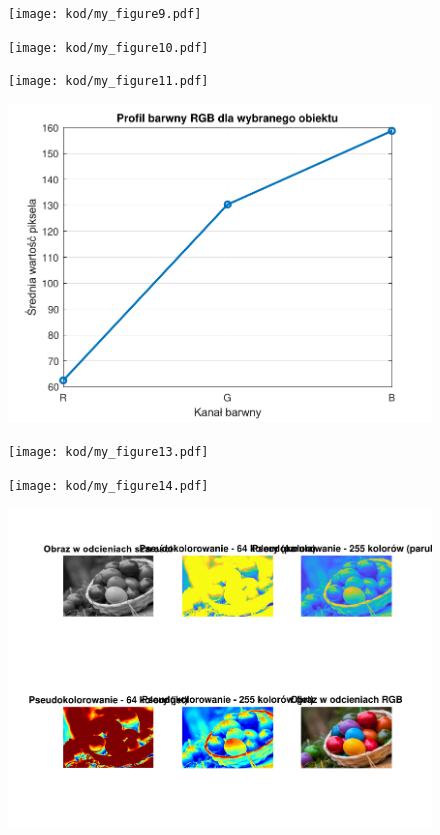 \documentclass[10pt,a4paper,twoside,twocolumn]{article}%
\begin{document}
\begin{figure}[H]\centering\texttt{[image: kod/my\_figure9.pdf]}\label{fig:my_figure9.pdf}\end{figure}

\begin{figure}[H]\centering\texttt{[image: kod/my\_figure10.pdf]}\label{fig:my_figure10.pdf}\end{figure}

\begin{figure}[H]\centering\texttt{[image: kod/my\_figure11.pdf]}\label{fig:my_figure11.pdf}\end{figure}

\begin{figure}[H]\centering\includegraphics[width=0.9\linewidth]{kod/my_figure12.pdf}\label{fig:my_figure12.pdf}\end{figure}

\begin{figure}[H]\centering\texttt{[image: kod/my\_figure13.pdf]}\label{fig:my_figure13.pdf}\end{figure}

\begin{figure}[H]\centering\texttt{[image: kod/my\_figure14.pdf]}\label{fig:my_figure14.pdf}\end{figure}

\begin{figure}[H]\centering\includegraphics[width=0.9\linewidth]{kod/my_figure15.pdf}\label{fig:my_figure15.pdf}\end{figure}
\end{document}
